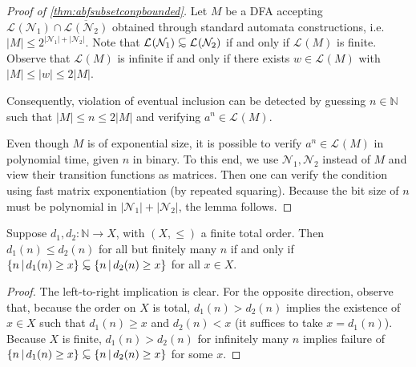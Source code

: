 \documentclass{lmcs}
\theoremstyle{plain}
\theoremstyle{definition}
\theoremstyle{remark}
\newcommand\lng[2]{\mathcal{L}_{#1}(#2)}
\newcommand\dgf{d}
\newcommand\nfa{\mathcal{N}}
\newcommand\abfsubset{\mathrel{{\ooalign{\hss\raisebox{-0.6ex}{\small$\sim$}\hss\cr\raisebox{0.4ex}{$\subset$}}}}
}
\begin{document}
\begin{proof}[Proof of \cref{thm:abfsubsetconpbounded}]
Let $M$ be a DFA  accepting $\lng{}{\nfa_1} \cap \overline{\lng{}{{\nfa_2}}}$ obtained through standard automata constructions, i.e. $|M| \le 2^{|\nfa_1|+|\nfa_2|}$.
Note that $\lng{}{\nfa_1} \abfsubset \lng{}{\nfa_2}$ if and only if $\lng{}{M}$ is finite.
Observe that $\lng{}{M}$ is infinite if and only if there exists $w\in \lng{}{M}$ with $|M| \le |w| \le 2|M|$.

Consequently, violation of eventual inclusion can be detected by
guessing $n\in \mathbb{N}$ such that $|M|\le n \le 2|M|$ and
verifying $a^n \in \lng{}{M}$.

Even though $M$ is of exponential size, it is possible to verify
$a^{n} \in \lng{}{M}$ in polynomial time, given $n$ in binary.
To this end, we use $\nfa_1, \nfa_2$ instead of $M$ and view their transition functions as matrices.
Then one can verify the condition using fast matrix exponentiation (by repeated squaring).
Because the bit size of $n$ must be polynomial in $|\nfa_1|+|\nfa_2|$, the lemma follows.
\end{proof}

\begin{lem}\label{lem:ei}
Suppose $\dgf_1,\dgf_2: \mathbb{N} \to X$, with $(X,\le)$ a finite total order.
Then $\dgf_1(n)\le \dgf_2(n)$ for all but finitely many $n$ if and only if
$\{ n\,|\, \dgf_1(n) \ge x\} \abfsubset \{ n\,|\, \dgf_2(n)\ge x\}$ for all $x\in X$.
\end{lem}
\begin{proof} 
The left-to-right implication is clear. For the opposite direction, observe that, because the order on $X$ is total, $\dgf_1(n) > \dgf_2(n)$
implies the existence of $x\in X$ such that $\dgf_1(n) \ge x$ and $\dgf_2(n) < x$ (it suffices to take $x=\dgf_1(n)$).
Because $X$ is finite,  $\dgf_1(n)>\dgf_2(n)$ for infinitely many $n$ implies failure of $\{ n\,|\, \dgf_1(n) \ge x\} \abfsubset \{ n\,|\, \dgf_2(n)\ge x\}$ for some $x$.
\end{proof}
\end{document}
